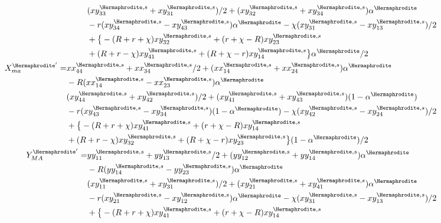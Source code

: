 \documentclass[12pt]{article}
\begin{document}
\begin{subequations}
\begin{align}
\begin{split}
&(xy_{33}^{\Hermaphrodite,s}+xy_{31}^{\Hermaphrodite,s})/2+(xy_{32}^{\Hermaphrodite,s}+xy_{34}^{\Hermaphrodite,s})\alpha^\Hermaphrodite\\
&- r(xy_{34}^{\Hermaphrodite,s}-xy_{43}^{\Hermaphrodite,s}) \alpha^\Hermaphrodite - \chi(xy_{31}^{\Hermaphrodite,s}-xy_{13}^{\Hermaphrodite,s})/2\\
&+\big{\{}-(R+r+\chi)xy_{32}^{\Hermaphrodite,s} +(r+\chi-R)xy_{23}^{\Hermaphrodite,s}\\
&+(R+r-\chi) xy_{41}^{\Hermaphrodite,s}+(R+\chi-r)xy_{14}^{\Hermaphrodite,s}\big{\}} \alpha^\Hermaphrodite/2
\end{split}
\\
%
\begin{split}
X_{ma}^{{\Hermaphrodite}'}=&xx_{44}^{\Hermaphrodite,s}+xx_{34}^{\Hermaphrodite,s}/2+(xx_{14}^{\Hermaphrodite,s}+xx_{24}^{\Hermaphrodite,s})\alpha^\Hermaphrodite\\
&-R(xx_{14}^{\Hermaphrodite,s}-xx_{23}^{\Hermaphrodite,s}) \alpha^\Hermaphrodite\\
&(xy_{44}^{\Hermaphrodite,s}+xy_{42}^{\Hermaphrodite,s})/2+(xy_{41}^{\Hermaphrodite,s}+xy_{43}^{\Hermaphrodite,s})(1-\alpha^\Hermaphrodite)\\
&- r(xy_{43}^{\Hermaphrodite,s}-xy_{34}^{\Hermaphrodite,s})(1-\alpha^\Hermaphrodite) - \chi(xy_{42}^{\Hermaphrodite,s}-xy_{24}^{\Hermaphrodite,s})/2\\
&+\big{\{}-(R+r+\chi)xy_{41}^{\Hermaphrodite,s}+(r+\chi-R)xy_{14}^{\Hermaphrodite,s}\\
&+(R+r-\chi) xy_{32}^{\Hermaphrodite,s}+(R+\chi-r)xy_{23}^{\Hermaphrodite,s}\big{\}}(1-\alpha^\Hermaphrodite)/2
\end{split}
\\
\begin{split}
Y_{MA}^{{\Hermaphrodite}'}=&yy_{11}^{\Hermaphrodite,s}+yy_{13}^{\Hermaphrodite,s}/2+(yy_{12}^{\Hermaphrodite,s}+yy_{14}^{\Hermaphrodite,s})\alpha^\Hermaphrodite\\
&-R(yy_{14}^{\Hermaphrodite,s}-yy_{23}^{\Hermaphrodite,s}) \alpha^\Hermaphrodite\\
&(xy_{11}^{\Hermaphrodite,s}+xy_{31}^{\Hermaphrodite,s})/2+(xy_{21}^{\Hermaphrodite,s}+xy_{41}^{\Hermaphrodite,s})\alpha^\Hermaphrodite\\
&- r(xy_{21}^{\Hermaphrodite,s}-xy_{12}^{\Hermaphrodite,s})\alpha^\Hermaphrodite - \chi(xy_{31}^{\Hermaphrodite,s}-xy_{13}^{\Hermaphrodite,s})/2\\
&+\big{\{} - (R+r+\chi)xy_{41}^{\Hermaphrodite,s} + (r+\chi-R)xy_{14}^{\Hermaphrodite,s}\\

\end{split}
\end{align}
\end{subequations}
\end{document}

